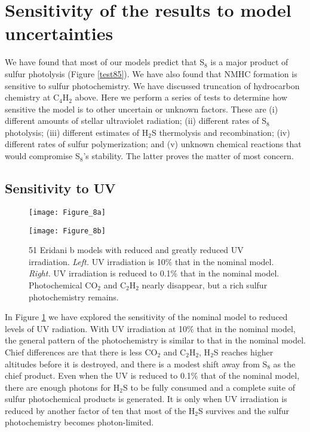 \documentclass[preprint]{aastex6}
\newcounter{reaction}
\begin{document}
\section{Sensitivity of the results to model uncertainties}
\label{section:sensitivity}

We have found that most of our models predict
that S$_8$ is a major product of sulfur photolysis (Figure \ref{test85}).
We have also found that NMHC formation is sensitive to sulfur photochemistry.
We have discussed truncation of hydrocarbon chemistry at C$_4$H$_2$ above.
 Here we perform a series of tests to determine how sensitive the model is to other uncertain or unknown factors.
These are (i) different amounts of stellar ultraviolet radiation;
(ii) different rates of S$_8$ photolysis;  
(iii) different estimates of H$_2$S thermolysis and recombination;
(iv) different rates of sulfur polymerization;
and (v) unknown chemical reactions that would compromise S$_8$'s stability.
The latter proves the matter of most concern. 

\subsection{Sensitivity to UV}

\begin{figure}[!htb]
 \centering
 \begin{minipage}[c]{0.49\textwidth}
   \centering
  \texttt{[image: Figure\_8a]} 
 \end{minipage}
 \begin{minipage}[c]{0.49\textwidth}
   \centering
 \texttt{[image: Figure\_8b]} 
 \end{minipage}
  \caption{\small 51 Eridani b models with reduced and greatly reduced UV irradiation. 
   {\it Left.} UV irradiation is 10\% that in the nominal model.
  {\it Right.} UV irradiation is reduced to 0.1\% that in the nominal model. 
  Photochemical CO$_2$ and C$_2$H$_2$ nearly disappear, but a rich sulfur photochemistry remains.
  }
\label{No_UV}
\end{figure}

In Figure \ref{No_UV} we have explored the sensitivity of the nominal model to reduced levels of UV radiation.
With UV irradiation at 10\% that in the nominal model, the general pattern of the photochemistry
   is similar to that in the nominal model.  Chief differences are that there is less CO$_2$ and 
   C$_2$H$_2$, H$_2$S reaches higher altitudes before it
   is destroyed, and there is a modest shift away from S$_8$ as the chief product.
   Even when the UV is reduced to 0.1\% that of the nominal model, there are enough photons
   for H$_2$S to be fully consumed and a complete suite of sulfur photochemical products is generated.
  It is only when UV irradiation is reduced by another factor of ten that most of the H$_2$S survives
  and the sulfur photochemistry becomes photon-limited.
\end{document}
